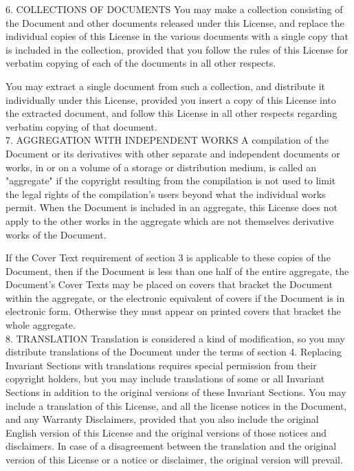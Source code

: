 \documentclass[10pt,a4paper]{article}
\begin{document}
\begin{scriptsize}
6. COLLECTIONS OF DOCUMENTS
You may make a collection consisting of the Document and other documents released under this License, and replace the individual copies of this License in the various documents with a single copy that is included in the collection, provided that you follow the rules of this License for verbatim copying of each of the documents in all other respects.

You may extract a single document from such a collection, and distribute it individually under this License, provided you insert a copy of this License into the extracted document, and follow this License in all other respects regarding verbatim copying of that document.\\

7. AGGREGATION WITH INDEPENDENT WORKS
A compilation of the Document or its derivatives with other separate and independent documents or works, in or on a volume of a storage or distribution medium, is called an "aggregate" if the copyright resulting from the compilation is not used to limit the legal rights of the compilation's users beyond what the individual works permit. When the Document is included in an aggregate, this License does not apply to the other works in the aggregate which are not themselves derivative works of the Document.

If the Cover Text requirement of section 3 is applicable to these copies of the Document, then if the Document is less than one half of the entire aggregate, the Document's Cover Texts may be placed on covers that bracket the Document within the aggregate, or the electronic equivalent of covers if the Document is in electronic form. Otherwise they must appear on printed covers that bracket the whole aggregate.\\

8. TRANSLATION
Translation is considered a kind of modification, so you may distribute translations of the Document under the terms of section 4. Replacing Invariant Sections with translations requires special permission from their copyright holders, but you may include translations of some or all Invariant Sections in addition to the original versions of these Invariant Sections. You may include a translation of this License, and all the license notices in the Document, and any Warranty Disclaimers, provided that you also include the original English version of this License and the original versions of those notices and disclaimers. In case of a disagreement between the translation and the original version of this License or a notice or disclaimer, the original version will prevail.


\end{scriptsize}
\end{document}
